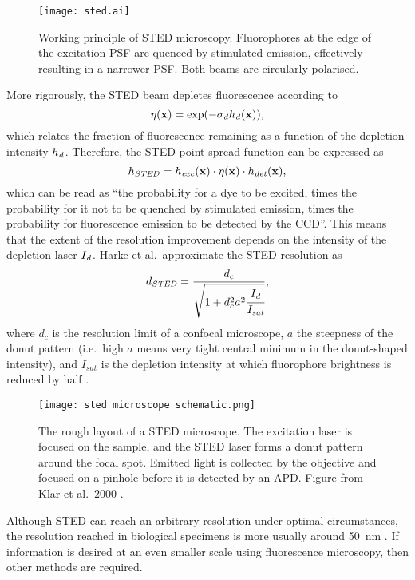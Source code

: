 \begin{figure}
	\centering
	\texttt{[image: sted.ai]}
	\caption{
		Working principle of STED microscopy. Fluorophores at the edge of the excitation PSF are quenced by stimulated emission, effectively resulting in a narrower PSF. Both beams are circularly polarised.
	}
	\label{fig:sted principle}
\end{figure}

More rigorously, the STED beam depletes fluorescence according to
\begin{equation}
	\eta(\vb{x}) = \exp(-\sigma_{\mathit{d}} h_{\mathit{d}}(\vb{x})),
\end{equation}
which relates the fraction of fluorescence remaining as a function of the depletion intensity $ h_{\mathit{d}} $. Therefore, the STED point spread function can be expressed as
\begin{equation}
	h_\mathit{STED} = h_\mathit{exc}(\vb{x}) \cdot \eta(\vb{x}) \cdot h_\mathit{det}(\vb{x}),
\end{equation}
which can be read as ``the probability for a dye to be excited, times the probability for it not to be quenched by stimulated emission, times the probability for fluorescence emission to be detected by the CCD''. This means that the extent of the resolution improvement depends on the intensity of the depletion laser $ I_{\mathit{d}}$. Harke et al.~approximate the STED resolution as
\begin{equation}
	d_\mathit{STED} = \frac{d_c}{\sqrt{1+d_c^2a^2\cfrac{I_{\mathit{d}}}{I_\mathit{sat}}}},
\end{equation}
where $ d_c $ is the resolution limit of a confocal microscope, $ a $ the steepness of the donut pattern (i.e.~high $ a $ means very tight central minimum in the donut-shaped intensity), and $ I_\mathit{sat} $ is the depletion intensity at which fluorophore brightness is reduced by half \cite{Harke2008}.

\begin{figure}
	\centering
	\texttt{[image: sted microscope schematic.png]}
	\caption{
		The rough layout of a STED microscope. The excitation laser is focused on the sample, and the STED laser forms a donut pattern around the focal spot. Emitted light is collected by the objective and focused on a pinhole before it is detected by an APD. Figure from Klar et al.~2000 \cite{Klar2000}. 
	}
	\label{fig:sted microscope}
\end{figure}

Although STED can reach an arbitrary resolution under optimal circumstances, the resolution reached in biological specimens is more usually around 50~nm \cite{Wildanger2012,Muller2012}. If information is desired at an even smaller scale using fluorescence microscopy, then other methods are required. 


